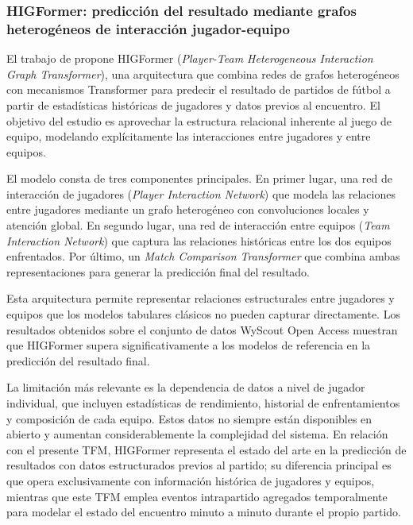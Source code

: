 \subsubsection{HIGFormer: predicción del resultado mediante grafos heterogéneos de interacción jugador-equipo}

El trabajo de \cite{wang2025higformer} propone HIGFormer (\textit{Player-Team Heterogeneous Interaction Graph Transformer}), una arquitectura que combina redes de grafos heterogéneos con mecanismos Transformer para predecir el resultado de partidos de fútbol a partir de estadísticas históricas de jugadores y datos previos al encuentro. El objetivo del estudio es aprovechar la estructura relacional inherente al juego de equipo, modelando explícitamente las interacciones entre jugadores y entre equipos.

El modelo consta de tres componentes principales. En primer lugar, una red de interacción de jugadores (\textit{Player Interaction Network}) que modela las relaciones entre jugadores mediante un grafo heterogéneo con convoluciones locales y atención global. En segundo lugar, una red de interacción entre equipos (\textit{Team Interaction Network}) que captura las relaciones históricas entre los dos equipos enfrentados. Por último, un \textit{Match Comparison Transformer} que combina ambas representaciones para generar la predicción final del resultado.

Esta arquitectura permite representar relaciones estructurales entre jugadores y equipos que los modelos tabulares clásicos no pueden capturar directamente. Los resultados obtenidos sobre el conjunto de datos WyScout Open Access muestran que HIGFormer supera significativamente a los modelos de referencia en la predicción del resultado final.

La limitación más relevante es la dependencia de datos a nivel de jugador individual, que incluyen estadísticas de rendimiento, historial de enfrentamientos y composición de cada equipo. Estos datos no siempre están disponibles en abierto y aumentan considerablemente la complejidad del sistema. En relación con el presente TFM, HIGFormer representa el estado del arte en la predicción de resultados con datos estructurados previos al partido; su diferencia principal es que opera exclusivamente con información histórica de jugadores y equipos, mientras que este TFM emplea eventos intrapartido agregados temporalmente para modelar el estado del encuentro minuto a minuto durante el propio partido.

